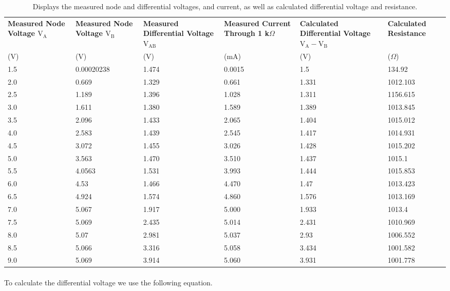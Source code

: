 \documentclass{article}
\begin{document}
\begin{table}[H]
\begin{tabularx}{\textwidth}{ | X | X | X | X | X | X | }
	\hline
	\textbf{Measured Node Voltage $\text{V}_\text{A}$} &
	\textbf{Measured Node Voltage $\text{V}_\text{B}$} &
	\textbf{Measured Differential Voltage $\text{V}_\text{AB}$} &
	\textbf{Measured Current Through 1 k$\Omega$} &
	\textbf{Calculated Differential Voltage $\text{V}_\text{A}-\text{V}_\text{B}$} &
	\textbf{Calculated Resistance} \\
	(V) & (V) & (V) & (mA) & (V) & ($\Omega$) \\
	\hline
	1.5 & 0.00020238 & 1.474 & 0.0015 & 1.5  & 134.92 \\
	2.0 & 0.669      & 1.329 & 0.661 & 1.331 & 1012.103  \\
	2.5 & 1.189      & 1.396 & 1.028 & 1.311 & 1156.615 \\
	3.0 & 1.611      & 1.380 & 1.589 & 1.389 & 1013.845 \\
	3.5 & 2.096      & 1.433 & 2.065 & 1.404 & 1015.012 \\
	4.0 & 2.583      & 1.439 & 2.545 & 1.417 & 1014.931 \\
	4.5 & 3.072      & 1.455 & 3.026 & 1.428 & 1015.202 \\
	5.0 & 3.563      & 1.470 & 3.510 & 1.437 & 1015.1 \\
	5.5 & 4.0563     & 1.531 & 3.993 & 1.444 & 1015.853 \\
	6.0 & 4.53       & 1.466 & 4.470 & 1.47  & 1013.423 \\
	6.5 & 4.924      & 1.574 & 4.860 & 1.576 & 1013.169 \\
	7.0 & 5.067      & 1.917 & 5.000 & 1.933 & 1013.4 \\
	7.5 & 5.069      & 2.435 & 5.014 & 2.431 & 1010.969 \\
	8.0 & 5.07       & 2.981 & 5.037 & 2.93  & 1006.552 \\
	8.5 & 5.066      & 3.316 & 5.058 & 3.434 & 1001.582 \\
	9.0 & 5.069      & 3.914 & 5.060 & 3.931 & 1001.778 \\
	\hline
\end{tabularx}
\caption{\label{tab:table-name}Displays the measured node and differential voltages, and current, as well as calculated differential voltage and resistance.}
\end{table}

\paragraph{}
To calculate the differential voltage we use the following equation.
\end{document}
